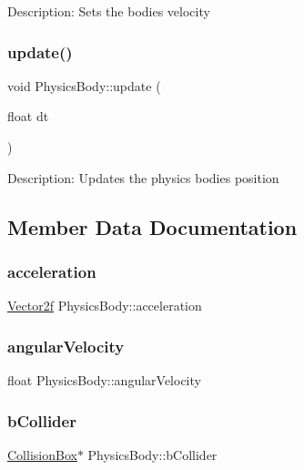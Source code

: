 Description\+: Sets the bodies velocity \mbox{\label{class_physics_body_abdba5d49a66c2fb3603ab001eafb9730}} 
\subsubsection{\texorpdfstring{update()}{update()}}
{\footnotesize\ttfamily void Physics\+Body\+::update (\begin{DoxyParamCaption}\item[{float}]{dt }\end{DoxyParamCaption})}

Description\+: Updates the physics bodies position 

\subsection{Member Data Documentation}
\mbox{\label{class_physics_body_aa7bce22d92646ebfb7bfd218b9b31435}} 
\subsubsection{\texorpdfstring{acceleration}{acceleration}}
{\footnotesize\ttfamily \mbox{\hyperlink{class_vector2f}{Vector2f}} Physics\+Body\+::acceleration}

\mbox{\label{class_physics_body_a132ee8b8b787694def109f1f2ae6a943}} 
\subsubsection{\texorpdfstring{angularVelocity}{angularVelocity}}
{\footnotesize\ttfamily float Physics\+Body\+::angular\+Velocity}

\mbox{\label{class_physics_body_a2e644dd99d939f7af5de4ab63c4c81ee}} 
\subsubsection{\texorpdfstring{bCollider}{bCollider}}
{\footnotesize\ttfamily \mbox{\hyperlink{class_collision_box}{Collision\+Box}}$\ast$ Physics\+Body\+::b\+Collider}

